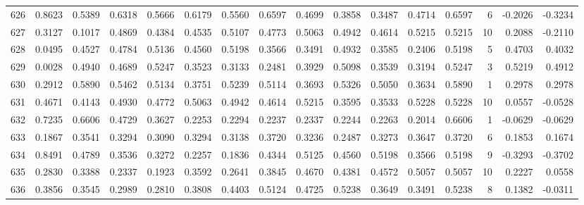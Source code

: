 \begin{tabular}{lrrrrrrrrrrrrrrr}
626 &      0.8623 &  0.5389 &  0.6318 &  0.5666 &  0.6179 &  0.5560 &  0.6597 &  0.4699 &  0.3858 &  0.3487 &   0.4714 &     0.6597 &      6 &                   -0.2026 &                    -0.3234 \\
627 &      0.3127 &  0.1017 &  0.4869 &  0.4384 &  0.4535 &  0.5107 &  0.4773 &  0.5063 &  0.4942 &  0.4614 &   0.5215 &     0.5215 &     10 &                    0.2088 &                    -0.2110 \\
628 &      0.0495 &  0.4527 &  0.4784 &  0.5136 &  0.4560 &  0.5198 &  0.3566 &  0.3491 &  0.4932 &  0.3585 &   0.2406 &     0.5198 &      5 &                    0.4703 &                     0.4032 \\
629 &      0.0028 &  0.4940 &  0.4689 &  0.5247 &  0.3523 &  0.3133 &  0.2481 &  0.3929 &  0.5098 &  0.3539 &   0.3194 &     0.5247 &      3 &                    0.5219 &                     0.4912 \\
630 &      0.2912 &  0.5890 &  0.5462 &  0.5134 &  0.3751 &  0.5239 &  0.5114 &  0.3693 &  0.5326 &  0.5050 &   0.3634 &     0.5890 &      1 &                    0.2978 &                     0.2978 \\
631 &      0.4671 &  0.4143 &  0.4930 &  0.4772 &  0.5063 &  0.4942 &  0.4614 &  0.5215 &  0.3595 &  0.3533 &   0.5228 &     0.5228 &     10 &                    0.0557 &                    -0.0528 \\
632 &      0.7235 &  0.6606 &  0.4729 &  0.3627 &  0.2253 &  0.2294 &  0.2237 &  0.2337 &  0.2244 &  0.2263 &   0.2014 &     0.6606 &      1 &                   -0.0629 &                    -0.0629 \\
633 &      0.1867 &  0.3541 &  0.3294 &  0.3090 &  0.3294 &  0.3138 &  0.3720 &  0.3236 &  0.2487 &  0.3273 &   0.3647 &     0.3720 &      6 &                    0.1853 &                     0.1674 \\
634 &      0.8491 &  0.4789 &  0.3536 &  0.3272 &  0.2257 &  0.1836 &  0.4344 &  0.5125 &  0.4560 &  0.5198 &   0.3566 &     0.5198 &      9 &                   -0.3293 &                    -0.3702 \\
635 &      0.2830 &  0.3388 &  0.2337 &  0.1923 &  0.3592 &  0.2641 &  0.3845 &  0.4670 &  0.4381 &  0.4572 &   0.5057 &     0.5057 &     10 &                    0.2227 &                     0.0558 \\
636 &      0.3856 &  0.3545 &  0.2989 &  0.2810 &  0.3808 &  0.4403 &  0.5124 &  0.4725 &  0.5238 &  0.3649 &   0.3491 &     0.5238 &      8 &                    0.1382 &                    -0.0311 \\

\end{tabular}
